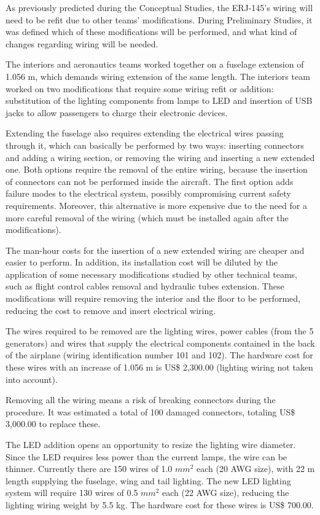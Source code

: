 ﻿As previously predicted during the Conceptual Studies, the ERJ-145's wiring will need to be refit due to other teams' modifications. During Preliminary Studies, it was defined which of these modifications will be performed, and what kind of changes regarding wiring will be needed.

The interiors and aeronautics teams worked together on a fuselage extension of 1.056 m, which demands wiring extension of the same length. The interiors team worked on two modifications that require some wiring refit or addition: substitution of the lighting components from lamps to LED and insertion of USB jacks to allow passengers to charge their electronic devices.

Extending the fuselage also requires extending the electrical wires passing through it, which can basically be performed by two ways: inserting connectors and adding a wiring section, or removing the wiring and inserting a new extended one. Both options require the removal of the entire wiring, because the insertion of connectors can not be performed inside the aircraft. The first option adds failure modes to the electrical system, possibly compromising current safety requirements. Moreover, this alternative is more expensive due to the need for a more careful removal of the wiring (which must be installed again after the modifications).

The man-hour costs for the insertion of a new extended wiring are cheaper and easier to perform. In addition, its installation cost will be diluted by the application of some necessary modifications studied by other technical teams, such as flight control cables removal and hydraulic tubes extension. These modifications will require removing the interior and the floor to be performed, reducing the cost to remove and insert electrical wiring.

The wires required to be removed are the lighting wires, power cables (from the 5 generators) and wires that supply the electrical components contained in the back of the airplane (wiring identification number 101 and 102). The hardware cost for these wires with an increase of 1.056 m is US\$ 2,300.00 (lighting wiring not taken into account).

Removing all the wiring means a risk of breaking connectors during the procedure. It was estimated a total of 100 damaged connectors, totaling US\$ 3,000.00 to replace these.

The LED addition opens an opportunity to resize the lighting wire diameter. Since the LED requires less power than the current lamps, the wire can be thinner. Currently there are 150 wires of  1.0 $mm^{2}$ each (20 AWG size), with 22 m length supplying the fuselage, wing and tail lighting. The new LED lighting system will require 130 wires of 0.5 $mm^{2}$ each (22 AWG size), reducing the lighting wiring weight by 5.5 kg. The hardware cost for these wires is US\$ 700.00.

